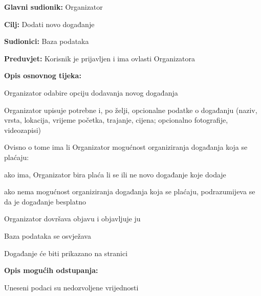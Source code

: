 	\noindent {}
	\begin{packed_item}
		
		\item \textbf{Glavni sudionik:} Organizator
		\item  \textbf{Cilj:} Dodati novo događanje 
		\item  \textbf{Sudionici:} Baza podataka
		\item  \textbf{Preduvjet:} Korisnik je prijavljen i ima ovlasti Organizatora
		\item  \textbf{Opis osnovnog tijeka:}
		
		\item[] \begin{packed_enum}
			
			\item Organizator odabire opciju dodavanja novog događanja
			\item Organizator upisuje potrebne i, po želji, opcionalne podatke o događanju (naziv, vrsta, lokacija, vrijeme početka, trajanje, cijena; opcionalno fotografije, videozapisi)
			
			\item Ovisno o tome ima li Organizator mogućnost organiziranja događanja koja se plaćaju: 
			\item[] \begin{packed_enum}
				\item ako ima, Organizator bira plaća li se ili ne novo događanje koje dodaje 
				\item ako nema mogućnost organiziranja događanja koja se plaćaju, podrazumijeva se da je događanje besplatno
			\end{packed_enum}
			
			\item Organizator dovršava objavu i objavljuje ju
			\item Baza podataka se osvježava
			\item Događanje će biti prikazano na stranici
			
		\end{packed_enum}
		
		\item  \textbf{Opis mogućih odstupanja:}
		
		\item[] \begin{packed_item}
			
			\item[2.a] Uneseni podaci su nedozvoljene vrijednosti
			\item[] \begin{packed_enum}
				

\end{packed_enum}
\end{packed_item}
\end{packed_item}
